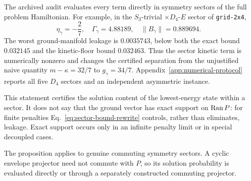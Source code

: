 The archived audit evaluates every term directly in symmetry sectors of the
full problem Hamiltonian.  For example, in the
$S_3$-trivial $\times D_4$-$E$ sector of \texttt{grid-2x4},
\begin{equation}
 \eta_\gamma=-\frac{2}{7},\quad
 \Gamma_\gamma=4.88189,\quad
 \|B_\gamma\|=0.889694.
 \label{eq:sector-audit-example}
\end{equation}
The worst ground-manifold leakage is $0.0035743$, below both the exact bound
$0.032145$ and the kinetic-floor bound $0.032463$.  Thus the sector kinetic
term is numerically nonzero and changes the certified separation from the
unjustified naive quantity $m-\kappa=32/7$ to
$g_\gamma=34/7$.  Appendix~\ref{app:numerical-protocol} reports all five
$D_4$ sectors and an independent asymmetric instance.

This statement certifies the solution content of the lowest-energy state
within a sector.  It does not say that the ground vector has exact support on
$\operatorname{Ran} P$: for finite penalties Eq.~\eqref{eq:sector-bound-rewrite} controls,
rather than eliminates, leakage.  Exact support occurs only in an infinite
penalty limit or in special decoupled cases.

The proposition applies to genuine commuting symmetry sectors.  A cyclic
envelope projector need not commute with $P$, so its solution probability is
evaluated directly or through a separately constructed commuting projector.
